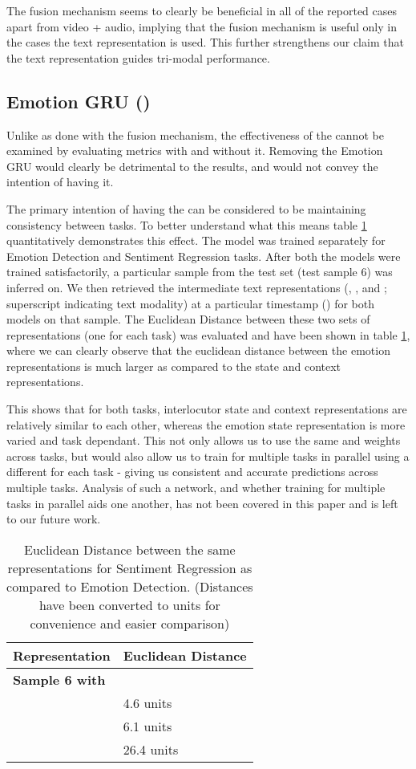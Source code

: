 \documentclass[11pt,a4paper]{article}
\begin{document}
The fusion mechanism seems to clearly be beneficial in all of the reported cases apart from video + audio, implying that the fusion mechanism is useful only in the cases the text representation is used. This further strengthens our claim that the text representation guides tri-modal performance.

\subsection{Emotion GRU ()}

Unlike as done with the fusion mechanism, the effectiveness of the  cannot be examined by evaluating metrics with and without it. Removing the Emotion GRU would clearly be detrimental to the results, and would not convey the intention of having it.

The primary intention of having the  can be considered to be maintaining consistency between tasks. To better understand what this means table \ref{tab:geru} quantitatively demonstrates this effect. The model was trained separately for Emotion Detection and Sentiment Regression tasks. After both the models were trained satisfactorily, a particular sample from the test set (test sample 6) was inferred on. We then retrieved the intermediate text representations (, , and ; superscript  indicating text modality) at a particular timestamp () for both models on that sample. The Euclidean Distance between these two sets of representations (one for each task) was evaluated and have been shown in table \ref{tab:geru}, where we can clearly observe that the euclidean distance between the emotion representations is much larger as compared to the state and context representations. 

This shows that for both tasks, interlocutor state and context representations are relatively similar to each other, whereas the emotion state representation is more varied and task dependant. This not only allows us to use the same  and  weights across tasks, but would also allow us to train for multiple tasks in parallel using a different  for each task - giving us consistent and accurate predictions across multiple tasks. Analysis of such a network, and whether training for multiple tasks in parallel aids one another, has not been covered in this paper and is left to our future work.

\begin{table}
\centering
\begin{tabular}{ll}
\hline
\textbf{Representation} & \textbf{Euclidean Distance} \\
\hline
\textbf{Sample 6 with } \\
\hline
 & 4.6  units \\
 & 6.1  units \\
 & 26.4 units \\
\hline

\end{tabular}
\caption{\label{tab:geru}
Euclidean Distance between the same representations for Sentiment Regression as compared to Emotion Detection. (Distances have been converted to units for convenience and easier comparison)
}
\end{table}
\end{document}
